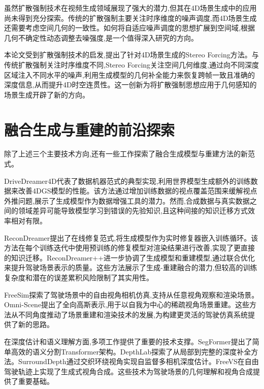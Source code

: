 虽然扩散强制技术在视频生成领域展现了强大的潜力,但其在4D场景生成中的应用尚未得到充分探索。传统的扩散强制主要关注时序维度的噪声调度,而4D场景生成还需要考虑空间几何的一致性。如何将自适应噪声调度的思想扩展到空间域,根据几何不确定性动态调整去噪强度,是一个值得深入研究的方向。

本论文受到扩散强制技术的启发,提出了针对4D场景生成的Stereo Forcing方法。与传统扩散强制关注时序维度不同,Stereo Forcing关注空间几何维度,通过向不同深度区域注入不同水平的噪声,利用生成模型的几何补全能力来恢复跨帧一致且准确的深度信息,从而提升4D时空连贯性。这一创新为将扩散强制思想应用于几何感知的场景生成开辟了新的方向。

\section{融合生成与重建的前沿探索}

除了上述三个主要技术方向,还有一些工作\cite{zhao2024drivedreamer4d,zhao2025drivedreamer4d_cvpr,ni2025recondreamer,zhao2025recondreamerpp,fan2024freesim,wei2025omniscene}探索了融合生成模型与重建方法的新范式。

DriveDreamer4D代表了数据机器范式的典型实现,利用世界模型生成额外的训练数据来改善4DGS模型的性能\cite{zhao2024drivedreamer4d,zhao2025drivedreamer4d_cvpr}。该方法通过增加训练数据的视点覆盖范围来缓解视点外推问题,展示了生成模型作为数据增强工具的潜力。然而,合成数据与真实数据之间的领域差异可能导致模型学习到错误的先验知识,且这种间接的知识迁移方式效率相对有限。

ReconDreamer提出了在线修复范式,将生成模型作为实时修复器嵌入训练循环\cite{ni2025recondreamer}。该方法在每个训练迭代中使用预训练的修复模型对渲染结果进行改善,实现了更直接的知识迁移。ReconDreamer++进一步协调了生成模型和重建模型,通过联合优化来提升驾驶场景表示的质量\cite{zhao2025recondreamerpp}。这些方法展示了生成-重建融合的潜力,但较高的训练复杂度和潜在的误差累积风险限制了其实用性。

FreeSim探索了驾驶场景中的自由视角相机仿真,支持从任意视角观察和渲染场景\cite{fan2024freesim}。Omni-Scene提出了全向高斯表示,用于以自我为中心的稀疏视角场景重建\cite{wei2025omniscene}。这些方法从不同角度推动了场景重建和渲染技术的发展,为构建更灵活的驾驶仿真系统提供了新的思路。

在深度估计和语义理解方面,多项工作\cite{xie2021segformer,liu2024depthlab,wei2023surrounddepth,wang2024freevs}提供了重要的技术支撑。SegFormer\cite{xie2021segformer}提出了简单高效的语义分割Transformer架构。DepthLab\cite{liu2024depthlab}探索了从局部到完整的深度补全方法。SurroundDepth\cite{wei2023surrounddepth}通过交织环绕视角实现自监督多相机深度估计。FreeVS\cite{wang2024freevs}在自由驾驶轨迹上实现了生成式视角合成。这些技术为驾驶场景的几何理解和视角合成提供了重要基础。

